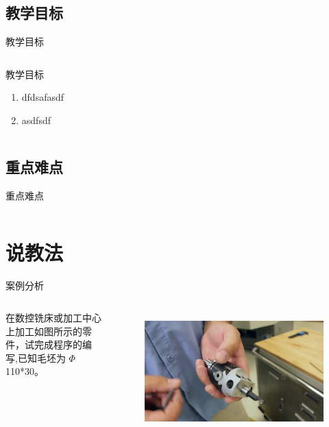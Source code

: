 \documentclass[UTF8,zihao=-4]{ctexbeamer}
\begin{document}
\subsection{教学目标}
\begin{frame}{教学目标}
 \begin{columns}[onlytextwidth]

        \begin{block}{教学目标}
        \begin{enumerate}
            \item dfdsafasdf 
            \item asdfsdf 
        \end{enumerate}
    \end{block}
    
\end{columns}
\end{frame}




\subsection{重点难点}

\begin{frame}{重点难点}
 \begin{columns}[onlytextwidth]
    \begin{block}
    \end{block}
\end{columns}



\end{frame}


\section{说教法}
\begin{frame}{案例分析}
     \begin{columns}[onlytextwidth]
        在数控铣床或加工中心上加工如图所示的零件，试完成程序的编写,已知毛坯为 $\Phi$ 110*30。

\begin{figure}
    \centering
    \includegraphics[width=0.8\linewidth,trim=50 150 50 100,clip]{image/4.jpg}
    \label{fig:4-1}
\end{figure}
    \end{columns}
\end{frame}
\end{document}
